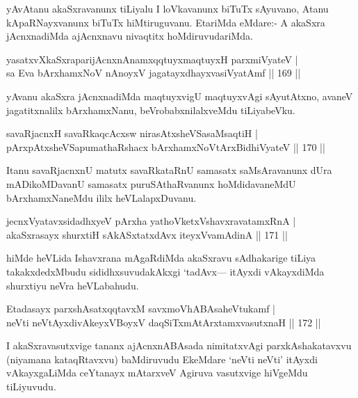 \begin{artha}%
yAvAtanu akaSxravanunx tiLiyalu I loVkavanunx biTuTx sAyuvano, Atanu kApaRNayxvanunx biTuTx hiMtiruguvanu. EtariMda eMdare:- A akaSxra jAcnxnadiMda ajAcnxnavu nivaqtitx hoMdiruvudariMda.
\end{artha}

\begin{shl}
yasatxvXkaSxraparijAcnxnAnamxqqtuyxmaqtuyxH parxmiVyateV |\\
sa Eva bArxhamxNoV nAnoyxV jagatayxdhayxvasiVyatAmf \hfill || 169 ||
\end{shl}

\begin{artha}
yAvanu akaSxra jAcnxnadiMda maqtuyxvigU maqtuyxvAgi sAyutAtxno, avaneV jagatitxnalilx bArxhamxNanu, beVrobabxnilalxveMdu tiLiyabeVku.
\end{artha}


\begin{shl}
savaRjacnxH savaRkaqcAcxsw nirasAtxsheVSasaMsaqtiH |\\
pArxpAtxsheVSapumathaRshacx bArxhamxNoV\s tArxBidhiVyateV \hfill || 170 ||
\end{shl}

\begin{artha}
Itanu savaRjacnxnU matutx savaRkataRnU samasatx saMsAravanunx dUra mADikoMDavanU samasatx puruSAthaRvanunx hoMdidavaneMdU bArxhamxNaneMdu ililx heVLalapxDuvanu.
\end{artha}

\begin{shl}
jecnxVyatavxsidadhxyeV pArxha yathoVketxVshavxravatamxRnA |\\
akaSxrasayx shurxtiH sAkASxtatxdAvx iteyxVvamAdinA \hfill || 171 ||
\end{shl}

\begin{artha}
hiMde heVLida Ishavxrana mAgaRdiMda akaSxravu sAdhakarige tiLiya takakxdedxMbudu sididhxsuvudakAkxgi `tadAvx--- itAyxdi vAkayxdiMda shurxtiyu neVra heVLabahudu.
\end{artha}

\begin{shl}
Etadasayx parxshAsatxqqtavxM savxmoVhABAsaheVtukamf |\\
neVti neVtAyxdivAkeyxVBoyxV daqSiTxmAtArxtamxvasutxnaH \hfill || 172 ||
\end{shl}

\begin{artha}%
I akaSxravasutxvige tananx ajAcnxnABAsada nimitatxvAgi parxkAshakatavxvu (niyamana kataqRtavxvu) baMdiruvudu EkeMdare `neVti neVti' itAyxdi vAkayxgaLiMda ceYtanayx mAtarxveV Agiruva vasutxvige hiVgeMdu tiLiyuvudu.
\end{artha}

